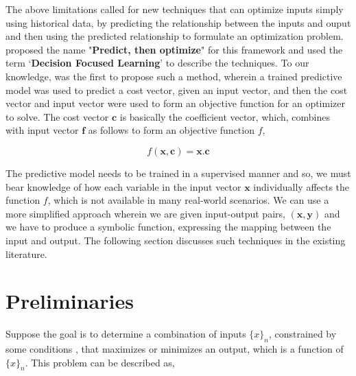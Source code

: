\documentclass[12pt, letterpaper]{article}
\begin{document}
The above limitations called for new techniques that can optimize inputs simply using historical data, by
predicting the relationship between the inputs and ouput and then using the predicted relationship to formulate
an optimization problem. \cite{Mandi_2024} proposed the name "\textbf{Predict, then optimize}" for this framework
and used the term `\textbf{Decision Focused Learning}' to describe the techniques. To our 
knowledge, \cite{spo} was the first to propose such a method, wherein a trained predictive model was used to 
predict a cost vector, given an input vector, and then the cost vector and input vector were used to form an 
objective function for an optimizer to solve. The cost vector $\mathbf{c}$ is basically the coefficient vector, 
which, combines with input vector $\mathbf{f}$ as follows to form an objective function $f$,

\begin{equation}
    f(\mathbf{x}, \mathbf{c}) = \mathbf{x}.{\mathbf{c}}
\end{equation}

The predictive model needs to be trained in a supervised manner and so, we must bear knowledge of how each 
variable in the input vector $\mathbf{x}$ individually affects the function $f$, which is not available in 
many real-world scenarios. We can use a more simplified approach wherein we are given input-output 
pairs, $\mathbf{(x,y)}$ and we have to produce a symbolic function, expressing the mapping between the input 
and output. The following section discusses such techniques in the existing literature. 

\section{Preliminaries}
Suppose the goal is to determine a combination of inputs $\{x\}_n$, constrained by some conditions , that maximizes or
minimizes an output, which is a function of $\{x\}_n$. This problem can be described as,


\end{document}
